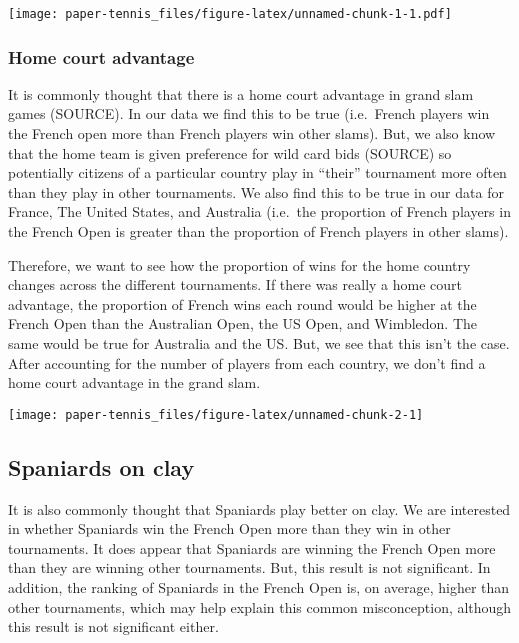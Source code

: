\documentclass[]{article}
\begin{document}
\texttt{[image: paper-tennis\_files/figure-latex/unnamed-chunk-1-1.pdf]}

\subsubsection{Home court advantage}\label{home-court-advantage}

It is commonly thought that there is a home court advantage in grand
slam games (SOURCE). In our data we find this to be true (i.e.~French
players win the French open more than French players win other slams).
But, we also know that the home team is given preference for wild card
bids (SOURCE) so potentially citizens of a particular country play in
``their'' tournament more often than they play in other tournaments. We
also find this to be true in our data for France, The United States, and
Australia (i.e.~the proportion of French players in the French Open is
greater than the proportion of French players in other slams).

Therefore, we want to see how the proportion of wins for the home
country changes across the different tournaments. If there was really a
home court advantage, the proportion of French wins each round would be
higher at the French Open than the Australian Open, the US Open, and
Wimbledon. The same would be true for Australia and the US. But, we see
that this isn't the case. After accounting for the number of players
from each country, we don't find a home court advantage in the grand
slam.

\begin{center}\texttt{[image: paper-tennis\_files/figure-latex/unnamed-chunk-2-1]} \end{center}

\subsection{Spaniards on clay}\label{spaniards-on-clay}

It is also commonly thought that Spaniards play better on clay. We are
interested in whether Spaniards win the French Open more than they win
in other tournaments. It does appear that Spaniards are winning the
French Open more than they are winning other tournaments. But, this
result is not significant. In addition, the ranking of Spaniards in the
French Open is, on average, higher than other tournaments, which may
help explain this common misconception, although this result is not
significant either.
\end{document}
